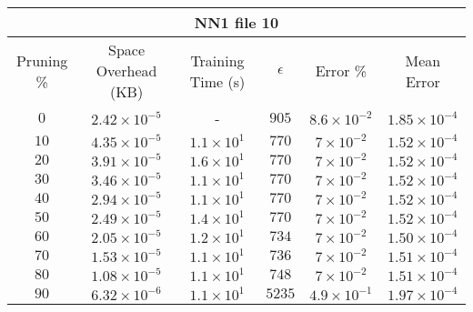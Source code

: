 \begin{adjustwidth}{0cm}{}
\begin{tabular}{cccccc}
\hline
\multicolumn{6}{c}{NN1 file 10} \\
\toprule
Pruning \% & Space Overhead (KB) & Training Time (s) & $\epsilon$ & Error \% & Mean Error\\
\midrule
$0$ & $2.42 \times 10^{-5}$ & - & $905$ & $8.6 \times 10^{-2}$ & $1.85 \times 10^{-4}$\\
$10$ & $4.35 \times 10^{-5}$ & $1.1 \times 10^{1}$ & $770$ & $7 \times 10^{-2}$ & $1.52 \times 10^{-4}$\\
$20$ & $3.91 \times 10^{-5}$ & $1.6 \times 10^{1}$ & $770$ & $7 \times 10^{-2}$ & $1.52 \times 10^{-4}$\\
$30$ & $3.46 \times 10^{-5}$ & $1.1 \times 10^{1}$ & $770$ & $7 \times 10^{-2}$ & $1.52 \times 10^{-4}$\\
$40$ & $2.94 \times 10^{-5}$ & $1.1 \times 10^{1}$ & $770$ & $7 \times 10^{-2}$ & $1.52 \times 10^{-4}$\\
$50$ & $2.49 \times 10^{-5}$ & $1.4 \times 10^{1}$ & $770$ & $7 \times 10^{-2}$ & $1.52 \times 10^{-4}$\\
$60$ & $2.05 \times 10^{-5}$ & $1.2 \times 10^{1}$ & $734$ & $7 \times 10^{-2}$ & $1.50 \times 10^{-4}$\\
$70$ & $1.53 \times 10^{-5}$ & $1.1 \times 10^{1}$ & $736$ & $7 \times 10^{-2}$ & $1.51 \times 10^{-4}$\\
$80$ & $1.08 \times 10^{-5}$ & $1.1 \times 10^{1}$ & $748$ & $7 \times 10^{-2}$ & $1.51 \times 10^{-4}$\\
$90$ & $6.32 \times 10^{-6}$ & $1.1 \times 10^{1}$ & $5235$ & $4.9 \times 10^{-1}$ & $1.97 \times 10^{-4}$\\
\bottomrule
\end{tabular}
\end{adjustwidth}

\newpage

